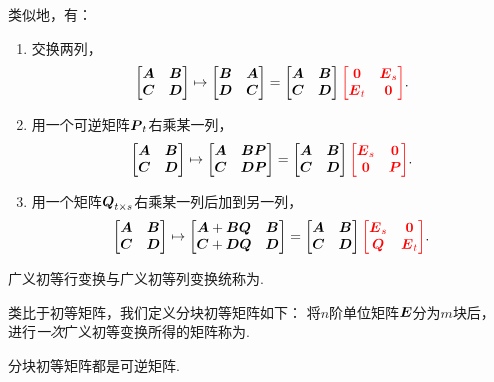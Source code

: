 类似地，有：
\begin{enumerate}
	\item 交换两列，\begin{equation*}
		\OriginalMatrix
		\mapsto \begin{bmatrix}
			\vb{B} & \vb{A} \\
			\vb{D} & \vb{C}
		\end{bmatrix}
		= \OriginalMatrix {\color{red} \begin{bmatrix}
			\vb0 & \vb{E}_s \\
			\vb{E}_t & \vb0
		\end{bmatrix}}.
	\end{equation*}

	\item 用一个可逆矩阵\(\vb{P}_t\)右乘某一列，\begin{equation*}
		\OriginalMatrix
		\mapsto \begin{bmatrix}
			\vb{A} & \vb{B}\vb{P} \\
			\vb{C} & \vb{D}\vb{P}
		\end{bmatrix}
		= \OriginalMatrix {\color{red} \begin{bmatrix}
			\vb{E}_s & \vb0 \\
			\vb0 & \vb{P}
		\end{bmatrix}}.
	\end{equation*}

	\item 用一个矩阵\(\vb{Q}_{t \times s}\)右乘某一列后加到另一列，\begin{equation*}
		\OriginalMatrix
		\mapsto \begin{bmatrix}
			\vb{A} + \vb{B}\vb{Q} & \vb{B} \\
			\vb{C} + \vb{D}\vb{Q} & \vb{D}
		\end{bmatrix}
		= \OriginalMatrix {\color{red} \begin{bmatrix}
			\vb{E}_s & \vb0 \\
			\vb{Q} & \vb{E}_t
		\end{bmatrix}}.
	\end{equation*}
\end{enumerate}

广义初等行变换与广义初等列变换统称为.

类比于初等矩阵，我们定义分块初等矩阵如下：
将\(n\)阶单位矩阵\(\vb{E}\)分为\(m\)块后，
进行\emph{一次}广义初等变换所得的矩阵称为.

\begin{property}
分块初等矩阵都是可逆矩阵.
\end{property}
